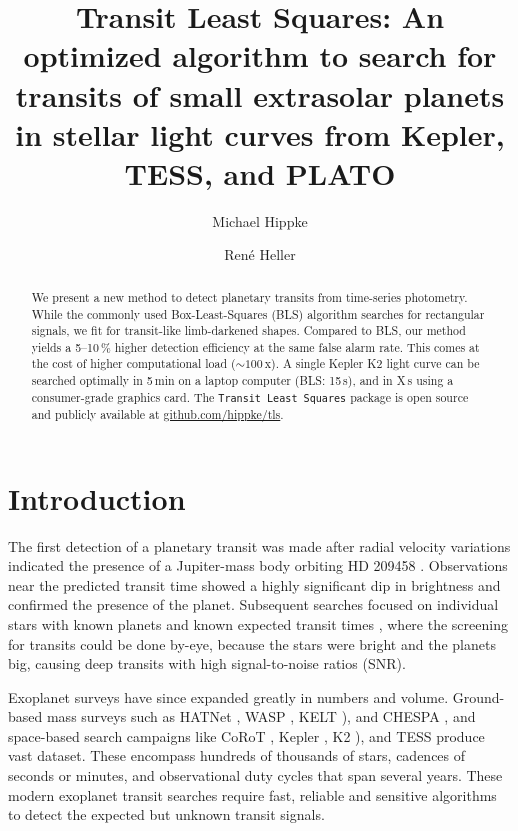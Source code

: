 \documentclass[twocolumn,tighten,longauthor]{myaastex62}
\begin{document}
\title{Transit Least Squares: An optimized algorithm to search for transits of small extrasolar planets in stellar light curves from Kepler, TESS, and PLATO}

\author[0000-0002-0794-6339]{Michael Hippke}

\author[0000-0002-9831-0984]{Ren\'{e} Heller}


\begin{abstract}
We present a new method to detect planetary transits from time-series photometry. While the commonly used Box-Least-Squares (BLS) algorithm searches for rectangular signals, we fit for transit-like limb-darkened shapes. Compared to BLS, our method yields a 5--10\,\% higher detection efficiency at the same false alarm rate. This comes at the cost of higher computational load ($\sim100\,$x). A single Kepler K2 light curve can be searched optimally in 5\,min on a laptop computer (BLS: 15\,s), and in X\,s using a consumer-grade graphics card. The \texttt{Transit Least Squares} package is open source and publicly available at \url{github.com/hippke/tls}.\\
\end{abstract}


\section{Introduction}
The first detection of a planetary transit  was made after radial velocity variations indicated the presence of a Jupiter-mass body orbiting HD 209458 \citep{2000ApJ...529L..45C}. Observations near the predicted transit time showed a highly significant dip in brightness and confirmed the presence of the planet. Subsequent searches focused on individual stars with known planets and known expected transit times \citep{2005ApJ...633..465S,2005A&A...444L..15B}, where the screening for transits could be done by-eye, because the stars were bright and the planets big, causing deep transits with high signal-to-noise ratios (SNR). 

Exoplanet surveys have since expanded greatly in numbers and volume. Ground-based mass surveys such as HATNet \citep{2004PASP..116..266B}, WASP \citep{2006PASP..118.1407P}, KELT \citep{2007PASP..119..923P}), and CHESPA \citep{2018arXiv180901789Z}, and space-based search campaigns like CoRoT \citep{2009A&A...506..411A}, Kepler \citep{2010Sci...327..977B}, K2 \citep{2014PASP..126..398H}), and TESS \citep{2014SPIE.9143E..20R} produce vast dataset. These encompass hundreds of thousands of stars, cadences of seconds or minutes, and observational duty cycles that span several years. These modern exoplanet transit searches require fast, reliable and sensitive algorithms to detect the expected but unknown transit signals.
\end{document}
